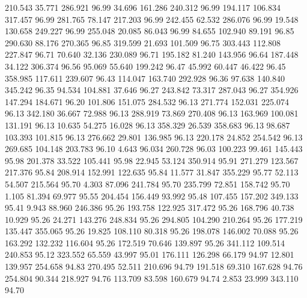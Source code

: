  210.543   35.771  286.921        96.99
  34.696  161.286  240.312        96.99
 194.117  106.834  317.457        96.99
 281.765   78.147  217.203        96.99
 242.455   62.532  286.076        96.99
  19.548  130.658  249.227        96.99
 255.048   20.085   86.043        96.99
  84.655  102.940   89.191        96.85
 290.630   88.176  270.365        96.85
 319.599   21.693  101.509        96.75
 303.443  112.808  227.847        96.71
  70.640   32.136  230.089        96.71
 195.182   81.240  143.956        96.64
 187.448   34.122  306.374        96.56
  95.069   55.640  199.242        96.47
  45.992   60.447   46.422        96.45
 358.985  117.611  239.607        96.43
 114.047  163.740  292.928        96.36
  97.638  140.840  345.242        96.35
  94.534  104.881   37.646        96.27
 243.842   73.317  287.043        96.27
 354.926  147.294  184.671        96.20
 101.806  151.075  284.532        96.13
 271.774  152.031  225.074        96.13
 342.180   36.667   72.988        96.13
 288.919   73.869  270.408        96.13
 163.969  100.081  131.191        96.13
  10.635   54.275   16.028        96.13
 358.329   26.539  358.683        96.13
  98.687  103.393  101.815        96.13
 276.662   29.801  136.985        96.13
 220.178   24.852  254.542        96.13
 269.685  104.148  203.783        96.10
   4.643   96.034  260.728        96.03
 100.223   99.461  145.443        95.98
 201.378   33.522  105.441        95.98
  22.945   53.124  350.914        95.91
 271.279  123.567  217.376        95.84
 208.914  152.991  122.635        95.84
  11.577   31.847  355.229        95.77
  52.113   54.507  215.564        95.70
   4.303   87.096  241.784        95.70
 235.799   72.851  158.742        95.70
   1.105   81.394   69.977        95.55
 204.454  156.449   93.992        95.48
 107.455  157.202  349.133        95.41
   9.943   88.960  246.386        95.26
 193.758  122.925  317.472        95.26
 168.796   40.738   10.929        95.26
  24.271  143.276  248.834        95.26
 294.805  104.290  210.264        95.26
 177.219  135.447  355.065        95.26
  19.825  108.110   80.318        95.26
 198.078  146.002   70.088        95.26
 163.292  132.232  116.604        95.26
 172.519   70.646  139.897        95.26
 341.112  109.514  240.853        95.12
 323.552   65.559   43.997        95.01
 176.111  126.298   66.179        94.97
  12.801  139.957  254.658        94.83
 270.495   52.511  210.696        94.79
 191.518   69.310  167.628        94.76
 254.804   90.344  218.927        94.76
 113.709   83.598  160.679        94.74
   2.853   23.999  343.110        94.70
